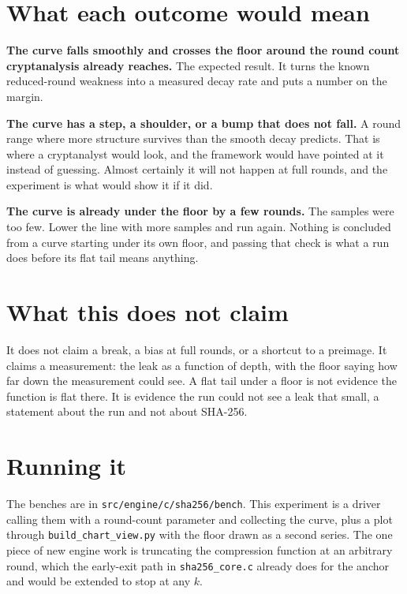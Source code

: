 \section{What each outcome would mean}

\textbf{The curve falls smoothly and crosses the floor around the round count cryptanalysis already reaches.} The expected result. It turns the known reduced-round weakness into a measured decay rate and puts a number on the margin.

\textbf{The curve has a step, a shoulder, or a bump that does not fall.} A round range where more structure survives than the smooth decay predicts. That is where a cryptanalyst would look, and the framework would have pointed at it instead of guessing. Almost certainly it will not happen at full rounds, and the experiment is what would show it if it did.

\textbf{The curve is already under the floor by a few rounds.} The samples were too few. Lower the line with more samples and run again. Nothing is concluded from a curve starting under its own floor, and passing that check is what a run does before its flat tail means anything.

\section{What this does not claim}

It does not claim a break, a bias at full rounds, or a shortcut to a preimage. It claims a measurement: the leak as a function of depth, with the floor saying how far down the measurement could see. A flat tail under a floor is not evidence the function is flat there. It is evidence the run could not see a leak that small, a statement about the run and not about SHA-256.

\section{Running it}

The benches are in \texttt{src/\allowbreak{}engine/\allowbreak{}c/\allowbreak{}sha256/\allowbreak{}bench}. This experiment is a driver calling them with a round-count parameter and collecting the curve, plus a plot through \texttt{build\_chart\_view.py} with the floor drawn as a second series. The one piece of new engine work is truncating the compression function at an arbitrary round, which the early-exit path in \texttt{sha256\_core.c} already does for the anchor and would be extended to stop at any \(k\).
